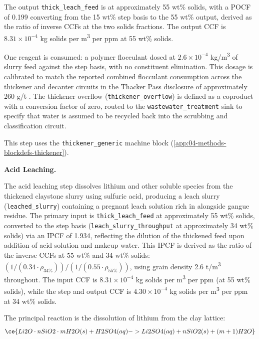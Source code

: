 The output \texttt{thick\_leach\_feed} is at approximately 55 wt\% solids, with a POCF of 0.199 converting from the 15 wt\% step basis to the 55 wt\% output, derived as the ratio of inverse CCFs at the two solids fractions. The output CCF is $8.31 \times 10^{-4}$ kg solids per m\textsuperscript{3} per ppm at 55 wt\% solids.

One reagent is consumed: a polymer flocculant dosed at $2.6 \times 10^{-4}$ kg/m\textsuperscript{3} of slurry feed against the step basis, with no constituent elimination. This dosage is calibrated to match the reported combined flocculant consumption across the thickener and decanter circuits in the Thacker Pass disclosure of approximately 260 g/t \cite{sgscanadaincSK1300Technical2024}. The thickener overflow (\texttt{thickener\_overflow}) is defined as a coproduct with a conversion factor of zero, routed to the \texttt{wastewater\_treatment} sink to specify that water is assumed to be recycled back into the scrubbing and classification circuit. 

This step uses the \texttt{thickener\_generic} machine block (\ref{app:04-methods-blockdefs-thickener}).

\medskip
\noindent\textbf{Acid Leaching.}\quad

The acid leaching step dissolves lithium and other soluble species from the thickened claystone slurry using sulfuric acid, producing a leach slurry (\texttt{leached\_slurry}) containing a pregnant leach solution rich in  alongside gangue residue. The primary input is \texttt{thick\_leach\_feed} at approximately 55 wt\% solids, converted to the step basis (\texttt{leach\_slurry\_throughput} at approximately 34 wt\% solids) via an IPCF of 1.934, reflecting the dilution of the thickened feed upon addition of acid solution and makeup water. This IPCF is derived as the ratio of the inverse CCFs at 55 wt\% and 34 wt\% solids: $(1/(0.34 \cdot \rho_{\text{34\%}})) / (1/(0.55 \cdot \rho_{\text{55\%}}))$, using grain density 2.6 t/m\textsuperscript{3} throughout. The input CCF is $8.31 \times 10^{-4}$ kg solids per m\textsuperscript{3} per ppm (at 55 wt\% solids), while the step and output CCF is $4.30 \times 10^{-4}$ kg solids per m\textsuperscript{3} per ppm at 34 wt\% solids.

The principal reaction is the dissolution of lithium from the clay lattice:
\vspace{-1em}
\begin{equation}
\ce{Li2O \cdot nSiO2 \cdot mH2O (s) + H2SO4 (aq) -> Li2SO4 (aq) + nSiO2 (s) + (m+1)H2O}
\end{equation}
\alteqend

